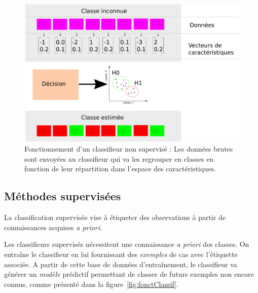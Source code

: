 \begin{figure}[h]
	\begin{center}
	\includegraphics[width=15cm]{images/fonctionnementClassifNonSup}
	\end{center}
	\caption[Fonctionnement d'un classifieur non supervisé]{Fonctionnement d'un classifieur non supervisé : Les données brutes sont envoyées au classifieur qui va les regrouper en classes en fonction de leur répartition dans l'espace des caractéristiques.}
	\label{fig:fonctionnementClassifNonSup}
\end{figure}


		\subsection{Méthodes supervisées}

La classification supervisée vise à étiqueter des observations à partir de connaissances acquises \textit{a priori}.

Les classifieurs supervisés nécessitent une connaissance \textit{a priori} des classes. On entraîne le classifieur en lui fournissant des \emph{exemples} de cas avec l'étiquette associée. A partir de cette base de données d'entraînement, le classifieur va générer un \emph{modèle} prédictif permettant de classer de futurs exemples non encore connus, comme présenté dans la figure~\ref{fig:fonctClassif}.

